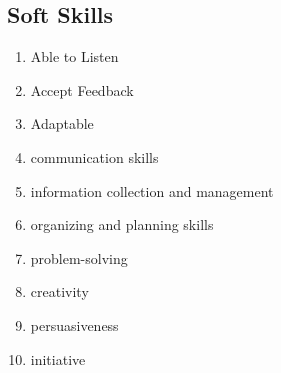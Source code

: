 \documentclass[margin,line]{res}
\begin{document}
\begin{resume}
\section{\sc Soft Skills}


\begin{enumerate}
	\item Able to Listen
	\item Accept Feedback
	\item Adaptable
	\item communication skills
	\item information collection and management
	\item organizing and planning skills
	\item problem-solving
	\item creativity
	\item persuasiveness
	\item initiative		    
\end{enumerate}


\end{resume}
\end{document}
